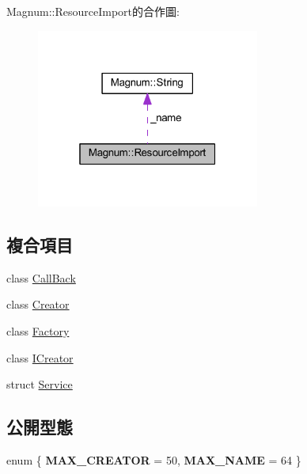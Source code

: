 Magnum\+:\+:Resource\+Import的合作圖\+:\nopagebreak
\begin{figure}[H]
\begin{center}
\leavevmode
\includegraphics[width=208pt]{class_magnum_1_1_resource_import__coll__graph}
\end{center}
\end{figure}
\subsection*{複合項目}
\begin{DoxyCompactItemize}
\item 
class \hyperlink{class_magnum_1_1_resource_import_1_1_call_back}{Call\+Back}
\item 
class \hyperlink{class_magnum_1_1_resource_import_1_1_creator}{Creator}
\item 
class \hyperlink{class_magnum_1_1_resource_import_1_1_factory}{Factory}
\item 
class \hyperlink{class_magnum_1_1_resource_import_1_1_i_creator}{I\+Creator}
\item 
struct \hyperlink{struct_magnum_1_1_resource_import_1_1_service}{Service}
\end{DoxyCompactItemize}
\subsection*{公開型態}
\begin{DoxyCompactItemize}
\item 
enum \{ {\bfseries M\+A\+X\+\_\+\+C\+R\+E\+A\+T\+OR} = 50, 
{\bfseries M\+A\+X\+\_\+\+N\+A\+ME} = 64
 \}\hypertarget{class_magnum_1_1_resource_import_a3706aa38b55b5ba350ef4965a78fe6ee}{}\label{class_magnum_1_1_resource_import_a3706aa38b55b5ba350ef4965a78fe6ee}

\end{DoxyCompactItemize}
